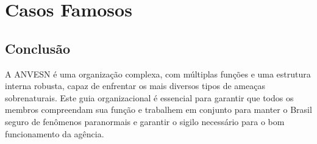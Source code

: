 \documentclass{book}
\begin{document}
\mainmatter




\part{Casos Famosos}


\backmatter
\chapter*{Conclusão}
A ANVESN é uma organização complexa, com múltiplas funções e uma estrutura interna robusta, capaz de enfrentar os mais diversos tipos de ameaças sobrenaturais. Este guia organizacional é essencial para garantir que todos os membros compreendam sua função e trabalhem em conjunto para manter o Brasil seguro de fenômenos paranormais e garantir o sigilo necessário para o bom funcionamento da agência.
\end{document}
